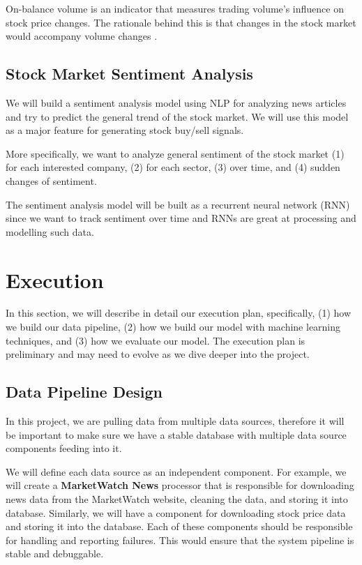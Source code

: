 \documentclass[10pt]{article}
\begin{document}
On-balance volume is an indicator that measures trading volume's influence on stock price changes. The rationale behind this is that changes in the stock market would accompany volume changes \cite{tadummies:2020}.


\subsection{Stock Market Sentiment Analysis}

We will build a sentiment analysis model using NLP for analyzing news articles and try to predict the general trend of the stock market. We will use this model as a major feature for generating stock buy/sell signals.

More specifically, we want to analyze general sentiment of the stock market (1) for each interested company, (2) for each sector, (3) over time, and (4) sudden changes of sentiment.

The sentiment analysis model will be built as a recurrent neural network (RNN) since we want to track sentiment over time and RNNs are great at processing and modelling such data.


\section{Execution}

In this section, we will describe in detail our execution plan, specifically, (1) how we build our data pipeline, (2) how we build our model with machine learning techniques, and (3) how we evaluate our model. The execution plan is preliminary and may need to evolve as we dive deeper into the project.

\subsection{Data Pipeline Design}

In this project, we are pulling data from multiple data sources, therefore it will be important to make sure we have a stable database with multiple data source components feeding into it.

We will define each data source as an independent component. For example, we will create a \textbf{MarketWatch News} processor that is responsible for downloading news data from the MarketWatch website, cleaning the data, and storing it into database. Similarly, we will have a component for downloading stock price data and storing it into the database. Each of these components should be responsible for handling and reporting failures. This would ensure that the system pipeline is stable and debuggable.
\end{document}
